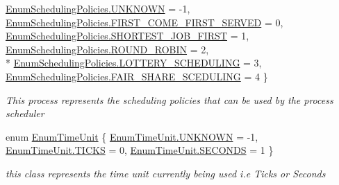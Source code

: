 \begin{DoxyCompactItemize}
\hyperlink{namespace_c_p_u___o_s___simulator_1_1_operating___system_ad0cdaacf9652394d23fa29109640fe08a696b031073e74bf2cb98e5ef201d4aa3}{Enum\+Scheduling\+Policies.\+U\+N\+K\+N\+O\+W\+N} = -\/1, 
\hyperlink{namespace_c_p_u___o_s___simulator_1_1_operating___system_ad0cdaacf9652394d23fa29109640fe08ae39fb551e5657a3c31eff06f11508d59}{Enum\+Scheduling\+Policies.\+F\+I\+R\+S\+T\+\_\+\+C\+O\+M\+E\+\_\+\+F\+I\+R\+S\+T\+\_\+\+S\+E\+R\+V\+E\+D} = 0, 
\hyperlink{namespace_c_p_u___o_s___simulator_1_1_operating___system_ad0cdaacf9652394d23fa29109640fe08aa5ffbf66adc3cfaa95173a6278f573dc}{Enum\+Scheduling\+Policies.\+S\+H\+O\+R\+T\+E\+S\+T\+\_\+\+J\+O\+B\+\_\+\+F\+I\+R\+S\+T} = 1, 
\hyperlink{namespace_c_p_u___o_s___simulator_1_1_operating___system_ad0cdaacf9652394d23fa29109640fe08a1ebd8dbf8c34e255f5cbf28f35860b71}{Enum\+Scheduling\+Policies.\+R\+O\+U\+N\+D\+\_\+\+R\+O\+B\+I\+N} = 2, 
\\*
\hyperlink{namespace_c_p_u___o_s___simulator_1_1_operating___system_ad0cdaacf9652394d23fa29109640fe08aa4d25b80a5834b7f9ff2a2153f3b5985}{Enum\+Scheduling\+Policies.\+L\+O\+T\+T\+E\+R\+Y\+\_\+\+S\+C\+H\+E\+D\+U\+L\+I\+N\+G} = 3, 
\hyperlink{namespace_c_p_u___o_s___simulator_1_1_operating___system_ad0cdaacf9652394d23fa29109640fe08abce82cf69e3b635b2e6aaacec9cb17dd}{Enum\+Scheduling\+Policies.\+F\+A\+I\+R\+\_\+\+S\+H\+A\+R\+E\+\_\+\+S\+C\+E\+D\+U\+L\+I\+N\+G} = 4
 \}\begin{DoxyCompactList}\small\item\em This process represents the scheduling policies that can be used by the process scheduler \end{DoxyCompactList}
\item 
enum \hyperlink{namespace_c_p_u___o_s___simulator_1_1_operating___system_a0553d0bc2513aec52caa769acf994d5c}{Enum\+Time\+Unit} \{ \hyperlink{namespace_c_p_u___o_s___simulator_1_1_operating___system_a0553d0bc2513aec52caa769acf994d5ca696b031073e74bf2cb98e5ef201d4aa3}{Enum\+Time\+Unit.\+U\+N\+K\+N\+O\+W\+N} = -\/1, 
\hyperlink{namespace_c_p_u___o_s___simulator_1_1_operating___system_a0553d0bc2513aec52caa769acf994d5caecf45696420c3fbb68822dafc3378261}{Enum\+Time\+Unit.\+T\+I\+C\+K\+S} = 0, 
\hyperlink{namespace_c_p_u___o_s___simulator_1_1_operating___system_a0553d0bc2513aec52caa769acf994d5caa9126caa6ef3db9cf3c35ac627ad22b5}{Enum\+Time\+Unit.\+S\+E\+C\+O\+N\+D\+S} = 1
 \}\begin{DoxyCompactList}\small\item\em this class represents the time unit currently being used i.\+e Ticks or Seconds \end{DoxyCompactList}
\end{DoxyCompactItemize}


